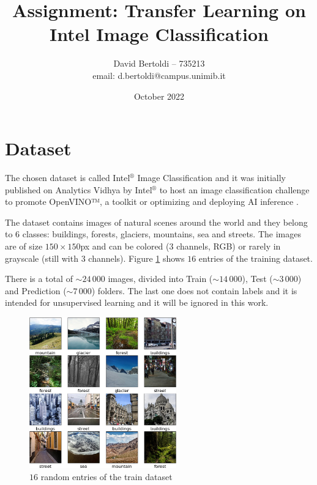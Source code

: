 \documentclass[compsoc]{IEEEtran}
\title{Assignment: Transfer Learning on Intel Image Classification}
\author{David Bertoldi -- 735213 \\ email: d.bertoldi@campus.unimib.it}
\affil{Department of Informatics, Systems and Communication}
\affil{University of Milano-Bicocca}
\date{October 2022}
\begin{document}
\maketitle 



\section{Dataset}\label{sec:insp}
The chosen dataset is called Intel$^\circledR$ Image Classification and it was initially published on Analytics Vidhya by Intel$^\circledR$ to host an image classification challenge to promote OpenVINO™, a toolkit or optimizing and deploying AI inference \cite{site1}\cite{site2}. \par

The dataset contains images of natural scenes around the world and they belong to $6$ classes: buildings, forests, glaciers, mountains, sea and streets. The images are of size $150\times150$px and can be colored ($3$ channels, RGB) or rarely in grayscale (still with $3$ channels). Figure \ref{fig:samples} shows $16$ entries of the training dataset. \par
There is a total of $\sim 24\,000$ images, divided into Train ($\sim14\,000$), Test ($\sim3\,000$) and Prediction ($\sim7\,000$) folders. The last one does not contain labels and it is intended for unsupervised learning and it will be ignored in this work.



\begin{figure}[ht!]
\centering                                                                        
\includegraphics[width=2.5in]{../images/samples.png}
\captionsetup{justification=centering}                                                                                         
\caption{$16$ random entries of the train dataset}
\label{fig:samples}                                                                                                                               
\end{figure}
\end{document}
